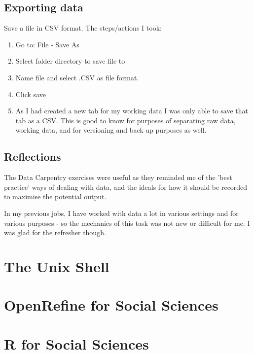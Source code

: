 \documentclass{article}
\begin{document}
\subsection{Exporting data}
Save a file in CSV format.
The steps/actions I took:
\begin{enumerate}
    \item Go to: File - Save As
    \item Select folder directory to save file to
    \item Name file and select .CSV as file format.
    \item Click save
    \item As I had created a new tab for my working data I was only able to save that tab as a CSV. This is good to know for purposes of separating raw data, working data, and for versioning and back up purposes as well. 
\end{enumerate}

\subsection{Reflections}
The Data Carpentry exercises were useful as they reminded me of the 'best practice' ways of dealing with data, and the ideals for how it should be recorded to maximise the potential output. 

In my previous  jobs, I have worked with data a lot in various settings and for various purposes - so the mechanics of this task was not new or difficult for me. I was glad for the refresher though. 


\section{The Unix Shell}

\section{OpenRefine for Social Sciences}

\section{R for Social Sciences}
\end{document}
